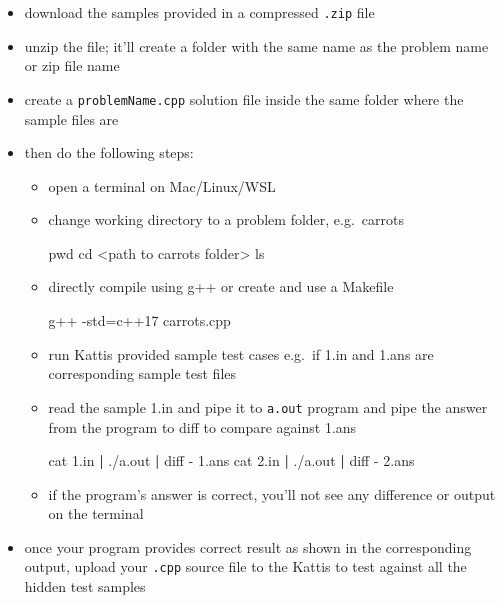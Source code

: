\documentclass[11pt]{article}
\providecommand{\tightlist}{%
      \setlength{\itemsep}{0pt}\setlength{\parskip}{0pt}}
\newenvironment{Shaded}{}{}
\newcommand{\KeywordTok}[1]{\textcolor[rgb]{0.00,0.44,0.13}{\textbf{{#1}}}}
\newcommand{\FunctionTok}[1]{\textcolor[rgb]{0.02,0.16,0.49}{{#1}}}
\newcommand{\NormalTok}[1]{{#1}}
\newcommand{\OperatorTok}[1]{\textcolor[rgb]{0.40,0.40,0.40}{{#1}}}
\newcommand{\BuiltInTok}[1]{{#1}}
\newcommand{\ExtensionTok}[1]{{#1}}
\newcommand{\AttributeTok}[1]{\textcolor[rgb]{0.49,0.56,0.16}{{#1}}}
\begin{document}
\begin{itemize}
\tightlist
\item
  download the samples provided in a compressed \texttt{.zip} file
\item
  unzip the file; it'll create a folder with the same name as the
  problem name or zip file name
\item
  create a \texttt{problemName.cpp} solution file inside the same folder
  where the sample files are
\item
  then do the following steps:

  \begin{itemize}
  \item
    open a terminal on Mac/Linux/WSL
  \item
    change working directory to a problem folder, e.g.~carrots

\begin{Shaded}
\begin{Highlighting}[]
\BuiltInTok{pwd}
\BuiltInTok{cd} \OperatorTok{\textless{}}\NormalTok{path to carrots folder}\OperatorTok{\textgreater{}}
\FunctionTok{ls}
\end{Highlighting}
\end{Shaded}
  \item
    directly compile using g++ or create and use a Makefile

\begin{Shaded}
\begin{Highlighting}[]
\ExtensionTok{g++} \AttributeTok{{-}std}\OperatorTok{=}\NormalTok{c++17 carrots.cpp}
\end{Highlighting}
\end{Shaded}
  \item
    run Kattis provided sample test cases e.g.~if 1.in and 1.ans are
    corresponding sample test files
  \item
    read the sample 1.in and pipe it to \texttt{a.out} program and pipe
    the answer from the program to diff to compare against 1.ans

\begin{Shaded}
\begin{Highlighting}[]
\FunctionTok{cat}\NormalTok{ 1.in }\KeywordTok{|} \ExtensionTok{./a.out} \KeywordTok{|} \FunctionTok{diff} \AttributeTok{{-}}\NormalTok{ 1.ans}
\FunctionTok{cat}\NormalTok{ 2.in }\KeywordTok{|} \ExtensionTok{./a.out} \KeywordTok{|} \FunctionTok{diff} \AttributeTok{{-}}\NormalTok{ 2.ans}
\end{Highlighting}
\end{Shaded}
  \item
    if the program's answer is correct, you'll not see any difference or
    output on the terminal
  \end{itemize}
\item
  once your program provides correct result as shown in the
  corresponding output, upload your \texttt{.cpp} source file to the
  Kattis to test against all the hidden test samples


\end{itemize}
\end{document}
